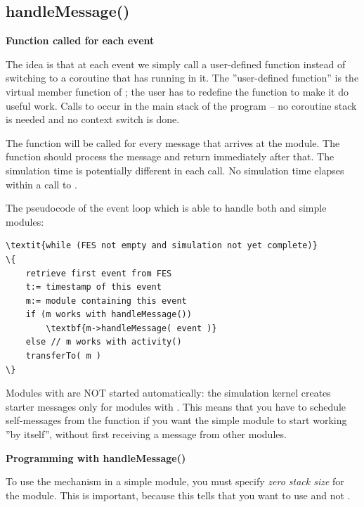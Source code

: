 \subsection{handleMessage()}

\textbf{Function called for each event}


The idea is that at each event we simply call a
user-defined function instead of switching to a coroutine that has
 running in it. The ''user-defined function'' is the
 virtual member
function of ; the user has to redefine the
function to make it do useful work.  Calls to 
occur in the main stack of the program -- no coroutine stack is needed
and no context switch is done.


The  function will be called for every message
that arrives at the module. The function should process the message
and return immediately after that. The simulation time is potentially
different in each call. No simulation time elapses within a call
to .


The pseudocode of the event loop which is able to handle both 
and  simple modules:


\begin{Verbatim}[commandchars=\\\{\}]
\textit{while (FES not empty and simulation not yet complete)}
\{
    retrieve first event from FES
    t:= timestamp of this event
    m:= module containing this event
    if (m works with handleMessage())
        \textbf{m->handleMessage( event )}
    else // m works with activity()
    transferTo( m )
\}
\end{Verbatim}


Modules with  are NOT started automatically:
the simulation kernel creates starter messages
only for modules with . This means that you have to
schedule self-messages from the
 function if you want the 
simple module to start working ''by itself'', without first receiving
a message from other modules.


\textbf{Programming with handleMessage()}


To use the  mechanism in a
simple module, you must specify \textit{zero
  stack size} for the module. This is
important, because this tells {\opp} that you want to use
 and not .

